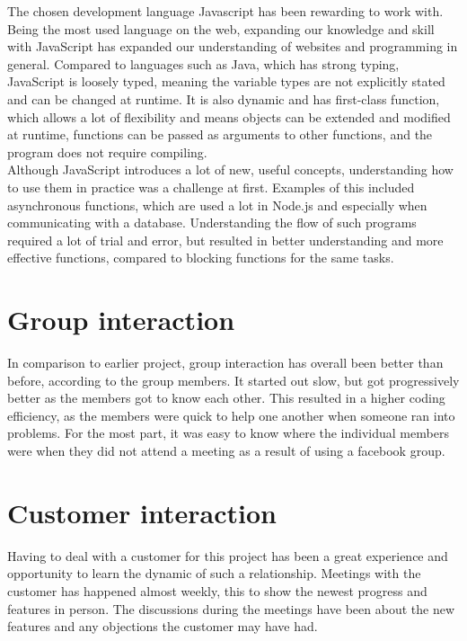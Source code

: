The chosen development language Javascript has been rewarding to work with. Being the most used language on the web, expanding our knowledge and skill with JavaScript has expanded our understanding of websites and programming in general. Compared to languages such as Java, which has strong typing, JavaScript is loosely typed, meaning the variable types are not explicitly stated and can be changed at runtime. It is also dynamic and has first-class function, which allows a lot of flexibility and means objects can be extended and modified at runtime, functions can be passed as arguments to other functions, and the program does not require compiling.\\
\newline
Although JavaScript introduces a lot of new, useful concepts, understanding how to use them in practice was a challenge at first. Examples of this included asynchronous functions, which are used a lot in Node.js and especially when communicating with a database. Understanding the flow of such programs required a lot of trial and error, but resulted in better understanding and more effective functions, compared to blocking functions for the same tasks.\\


\section{Group interaction}

In comparison to earlier project, group interaction has overall been better than before, according to the group members. It started out slow, but got progressively better as the members got to know each other. This resulted in a higher coding efficiency, as the members were quick to help one another when someone ran into problems. For the most part, it was easy to know where the individual members were when they did not attend a meeting as a result of using a facebook group.

\section{Customer interaction}

Having to deal with a customer for this project has been a great experience and opportunity to learn the dynamic of such a relationship. Meetings with the customer has happened almost weekly, this to show the newest progress and features in person. The discussions during the meetings have been about the new features and any objections the customer may have had. 

